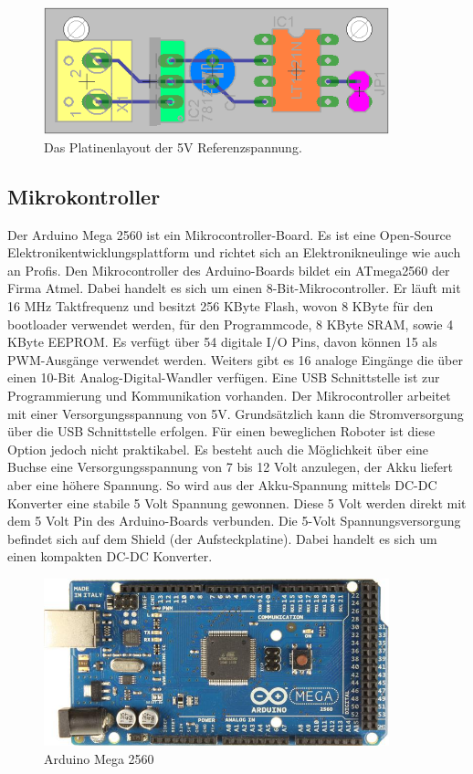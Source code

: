 \documentclass[a4paper,bibtotoc,oneside]{scrbook}
\begin{document}
\begin{figure}[htbp]
\centering
\includegraphics[width=100mm]{img/refu2.png}
\caption{Das Platinenlayout der 5V Referenzspannung.}\label{refu2}
\end{figure}

 
\subsection{Mikrokontroller}\thispagestyle{empty}
Der Arduino Mega 2560 ist ein Mikrocontroller-Board. Es ist eine Open-Source Elektronikentwicklungsplattform und richtet sich an Elektronikneulinge wie auch an Profis. Den Mikrocontroller des Arduino-Boards bildet ein ATmega2560 der Firma Atmel. Dabei handelt es sich um einen 8-Bit-Mikrocontroller.  Er läuft mit 16 MHz Taktfrequenz und besitzt 256 KByte Flash, wovon 8 KByte für den bootloader verwendet werden, für den Programmcode, 8 KByte SRAM, sowie 4 KByte EEPROM.  Es verfügt über 54 digitale I/O Pins, davon können 15 als PWM-Ausgänge verwendet werden. Weiters gibt es 16 analoge Eingänge die über einen 10-Bit Analog-Digital-Wandler verfügen.
Eine USB Schnittstelle ist zur Programmierung und Kommunikation vorhanden.
Der Mikrocontroller arbeitet mit einer Versorgungsspannung von 5V. Grundsätzlich kann die Stromversorgung über die USB Schnittstelle erfolgen. Für einen beweglichen Roboter ist diese Option jedoch nicht praktikabel. Es besteht auch die Möglichkeit über eine Buchse eine Versorgungsspannung von 7 bis 12 Volt anzulegen, der Akku liefert aber eine höhere Spannung. So wird aus der Akku-Spannung mittels DC-DC Konverter
eine stabile 5 Volt Spannung gewonnen. Diese 5 Volt werden direkt mit dem 5 Volt Pin des Arduino-Boards verbunden. Die 5-Volt Spannungsversorgung befindet sich auf dem Shield (der Aufsteckplatine). Dabei handelt es sich um einen kompakten DC-DC Konverter.

\begin{figure}[htbp]
\centering
\includegraphics[width=100mm]{img/ArduinoMega2.jpg}
\caption[Arduino Mega 2560]{Arduino Mega 2560}\label{ardu}
\end{figure}
\end{document}
